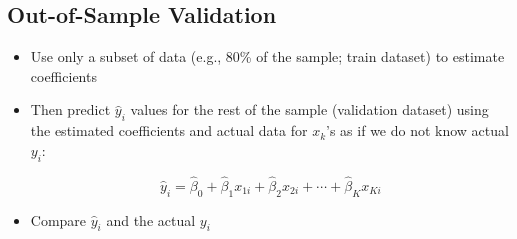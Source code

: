 \documentclass[10pt,article]{article}
\begin{document}
\subsection{Out-of-Sample Validation}
\label{sec:orgdcf4cb6}
\begin{itemize}
\item Use only a subset of data (e.g., 80\% of the sample; train dataset) to estimate coefficients
\item Then predict \(\hat{y}_i\) values for the rest of the sample (validation
dataset) using the estimated coefficients and actual data for \(x_{k}\)'s
as if we do not know actual \(y_{i}\):

\[ \hat{y}_{i}= \hat{\beta}_{0} + \hat{\beta}_{1} x_{1i} +
      \hat{\beta}_{2} x_{2i} + \cdots + \hat{\beta}_{K} x_{Ki} \]

\item Compare \(\hat{y}_{i}\) and the actual \(y_{i}\)
\end{itemize}
\end{document}
